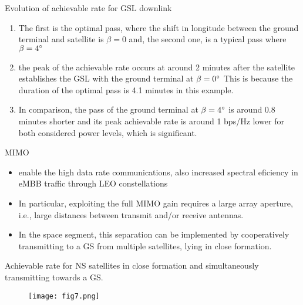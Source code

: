 \documentclass{beamer}
\begin{document}
\begin{frame}
\begin{block}{Evolution of achievable rate for GSL downlink}
\begin{enumerate}
    \item The first is the optimal pass, where the shift
in longitude between the ground terminal and satellite is
$\beta = 0$ and, the second one, is a typical pass where $\beta = 4\degree$
\item the peak of the achievable rate occurs at
around 2 minutes after the satellite establishes the GSL with
the ground terminal at $\beta = 0\degree$ This is because the duration
of the optimal pass is 4.1 minutes in this example.
\item In comparison, the pass of the
ground terminal at $\beta =   4\degree$ is around 0.8 minutes shorter and
its peak achievable rate is around 1 bps/Hz lower for both
considered power levels, which is significant.
\end{enumerate}
\end{block}

\end{frame}
\begin{frame}
  \begin{block}{MIMO}
  \begin{itemize}
      \item enable the high data rate communications, also increased spectral eficiency in eMBB traffic through
LEO constellations
\item In particular, exploiting the full MIMO gain requires a large array aperture, i.e., large distances between transmit and/or receive antennas.
\item In the space segment, this separation can be implemented
by cooperatively transmitting to a GS from multiple
satellites, lying in close formation.
 \end{itemize}
\end{block}  
\end{frame}

\begin{frame}{Achievable rate for NS satellites in close formation and
simultaneously transmitting towards a GS.}
\begin{figure}
    \centering
    \texttt{[image: fig7.png]}
\end{figure}
\end{frame}
\end{document}
